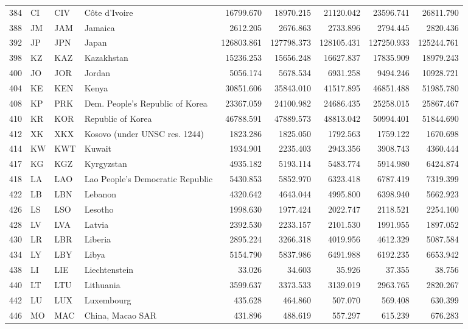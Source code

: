 {\begin{longtable}{rlllrrrrr}
 384 & CI & CIV & Côte d'Ivoire & 16799.670 & 18970.215 & 21120.042 & 23596.741 & 26811.790 \\
 388 & JM & JAM & Jamaica & 2612.205 & 2676.863 & 2733.896 & 2794.445 & 2820.436 \\
 392 & JP & JPN & Japan & 126803.861 & 127798.373 & 128105.431 & 127250.933 & 125244.761 \\
 398 & KZ & KAZ & Kazakhstan & 15236.253 & 15656.248 & 16627.837 & 17835.909 & 18979.243 \\
 400 & JO & JOR & Jordan & 5056.174 & 5678.534 & 6931.258 & 9494.246 & 10928.721 \\
 404 & KE & KEN & Kenya & 30851.606 & 35843.010 & 41517.895 & 46851.488 & 51985.780 \\
 408 & KP & PRK & Dem. People's Republic of Korea & 23367.059 & 24100.982 & 24686.435 & 25258.015 & 25867.467 \\
 410 & KR & KOR & Republic of Korea & 46788.591 & 47889.573 & 48813.042 & 50994.401 & 51844.690 \\
 412 & XK & XKX & Kosovo (under UNSC res. 1244) & 1823.286 & 1825.050 & 1792.563 & 1759.122 & 1670.698 \\
 414 & KW & KWT & Kuwait & 1934.901 & 2235.403 & 2943.356 & 3908.743 & 4360.444 \\
 417 & KG & KGZ & Kyrgyzstan & 4935.182 & 5193.114 & 5483.774 & 5914.980 & 6424.874 \\
 418 & LA & LAO & Lao People's Democratic Republic & 5430.853 & 5852.970 & 6323.418 & 6787.419 & 7319.399 \\
 422 & LB & LBN & Lebanon & 4320.642 & 4643.044 & 4995.800 & 6398.940 & 5662.923 \\
 426 & LS & LSO & Lesotho & 1998.630 & 1977.424 & 2022.747 & 2118.521 & 2254.100 \\
 428 & LV & LVA & Latvia & 2392.530 & 2233.157 & 2101.530 & 1991.955 & 1897.052 \\
 430 & LR & LBR & Liberia & 2895.224 & 3266.318 & 4019.956 & 4612.329 & 5087.584 \\
 434 & LY & LBY & Libya & 5154.790 & 5837.986 & 6491.988 & 6192.235 & 6653.942 \\
 438 & LI & LIE & Liechtenstein & 33.026 & 34.603 & 35.926 & 37.355 & 38.756 \\
 440 & LT & LTU & Lithuania & 3599.637 & 3373.533 & 3139.019 & 2963.765 & 2820.267 \\
 442 & LU & LUX & Luxembourg & 435.628 & 464.860 & 507.070 & 569.408 & 630.399 \\
 446 & MO & MAC & China, Macao SAR & 431.896 & 488.619 & 557.297 & 615.239 & 676.283 \\

\end{longtable}}
